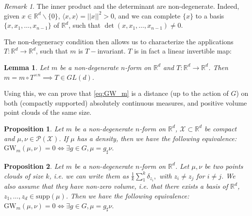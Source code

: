 \documentclass{article}
\newcommand{\R}{\mathbb{R}}
\newcommand{\X}{\mathcal{X}}
\newcommand{\1}{\mathbf{1}}
\newcommand{\GW}{\mathrm{GW}}
\renewcommand{\P}{\mathcal{P}}
\newtheorem{lemma}{Lemma}
\newtheorem{proposition}{Proposition}
\theoremstyle{definition}
\theoremstyle{remark}
\newtheorem*{remark}{Remark}
\begin{document}
\begin{remark}
    The inner product and the determinant are  non-degenerate. Indeed,  given $x\in \R^d\backslash \{0\}$, $\langle x,x\rangle = ||x||^2>0$, and  we can complete $\{x\}$ to a basis $\{x, x_1,\dots,x_{n-1}\}$ of $\R^d$, such that $\det(x, x_1,\dots,x_{n-1})\neq0$.
\end{remark}

The non-degeneracy condition then allows us to characterize the applications $T: \mathbb{R}^d \rightarrow \mathbb{R}^d$, such that $m$ is $T-$invariant. $T$ is in fact a linear invertible map:



\begin{lemma}\label{lem:degeneracy}
    Let $m$ be a non-degenerate $n$-form on $\R^d$ and $T:\R^d\to\R^d$. Then $m=m\circ T^{\times n}\implies T\in GL(d).$
\end{lemma}


Using this, we can prove that \ref{eq:GW_m} is a distance (up to the action of $G$) on both (compactly supported) absolutely continuous measures, and positive volume point clouds of the same size.

\begin{proposition}\label{prop:GLD_transform}
    Let $m$ be a non-degenerate $n$-form on $\R^d$, $\X\subset \R^d$ be compact and $\mu,\nu\in \P(\X)$.
    If $\mu$ has a density, then we have the following equivalence: $ \GW_{m}(\mu,\nu)= 0 \Leftrightarrow \exists g\in G, \mu = g_\sharp\nu .$
\end{proposition}

\begin{proposition}\label{prop:point_cloud} 
    Let $m$ be a non-degenerate $n$-form on $\R^d$.
    Let $\mu, \nu$ be two points clouds of size $k$, i.e. we can write them as $\frac{1}{k}\sum_{1}^k \delta_{z_i},$ with $ z_i\neq z_j$ for $i\neq j$. We also assume that they  have non-zero volume, i.e. that there exists a basis of $\R^d$, $z_1, \dots,z_d\in \mathrm{supp}(\mu)$.
    Then we have the following equivalence: $ \GW_{m}(\mu,\nu)= 0 \Leftrightarrow \exists g\in G, \mu = g_\sharp\nu .$
\end{proposition}
\end{document}
